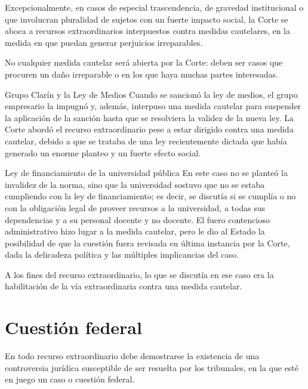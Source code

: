 \documentclass[12pt,oneside]{book}
\begin{document}
Excepcionalmente, en casos de especial trascendencia, de gravedad institucional o que involucran pluralidad de sujetos con un fuerte impacto social, la Corte se aboca a recursos extraordinarios interpuestos contra medidas cautelares, en la medida en que puedan generar perjuicios irreparables.

\begin{important}
No cualquier medida cautelar será abierta por la Corte: deben ser casos que procuren un daño irreparable o en los que haya muchas partes interesadas.
\end{important}

\begin{example}{Grupo Clarín y la Ley de Medios}
Cuando se sancionó la ley de medios, el grupo empresario la impugnó y, además, interpuso una medida cautelar para suspender la aplicación de la sanción hasta que se resolviera la validez de la nueva ley. La Corte abordó el recurso extraordinario pese a estar dirigido contra una medida cautelar, debido a que se trataba de una ley recientemente dictada que había generado un enorme planteo y un fuerte efecto social.
\end{example}

\begin{example}{Ley de financiamiento de la universidad pública}
En este caso no se planteó la invalidez de la norma, sino que la universidad sostuvo que no se estaba cumpliendo con la ley de financiamiento; es decir, se discutía si se cumplía o no con la obligación legal de proveer recursos a la universidad, a todas sus dependencias y a su personal docente y no docente. El fuero contencioso administrativo hizo lugar a la medida cautelar, pero le dio al Estado la posibilidad de que la cuestión fuera revisada en última instancia por la Corte, dada la delicadeza política y las múltiples implicancias del caso.

A los fines del recurso extraordinario, lo que se discutía en ese caso era la habilitación de la vía extraordinaria contra una medida cautelar.
\end{example}

\section{Cuestión federal}

En todo recurso extraordinario debe demostrarse la existencia de una controversia jurídica susceptible de ser resuelta por los tribunales, en la que esté en juego un caso o cuestión federal.
\end{document}
